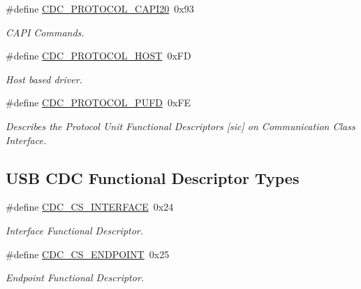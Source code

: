 \begin{DoxyCompactItemize}
\mbox{\label{group__cdc__protocol__group_ga4ae176ca7b4078cfc2506faff308d049}} 
\#define \hyperlink{group__cdc__protocol__group_ga4ae176ca7b4078cfc2506faff308d049}{C\+D\+C\+\_\+\+P\+R\+O\+T\+O\+C\+O\+L\+\_\+\+C\+A\+P\+I20}~0x93
\begin{DoxyCompactList}\small\item\em C\+A\+PI Commands. \end{DoxyCompactList}\item 
\mbox{\label{group__cdc__protocol__group_gae3fb87c639e467c9e9a1cab674a53463}} 
\#define \hyperlink{group__cdc__protocol__group_gae3fb87c639e467c9e9a1cab674a53463}{C\+D\+C\+\_\+\+P\+R\+O\+T\+O\+C\+O\+L\+\_\+\+H\+O\+ST}~0x\+FD
\begin{DoxyCompactList}\small\item\em Host based driver. \end{DoxyCompactList}\item 
\mbox{\label{group__cdc__protocol__group_gaa4704c0876c47f0fc9b4e1e2812a746c}} 
\#define \hyperlink{group__cdc__protocol__group_gaa4704c0876c47f0fc9b4e1e2812a746c}{C\+D\+C\+\_\+\+P\+R\+O\+T\+O\+C\+O\+L\+\_\+\+P\+U\+FD}~0x\+FE
\begin{DoxyCompactList}\small\item\em Describes the Protocol Unit Functional Descriptors \mbox{[}sic\mbox{]} on Communication Class Interface. \end{DoxyCompactList}\end{DoxyCompactItemize}
\subsection*{U\+SB C\+DC Functional Descriptor Types}
\begin{DoxyCompactItemize}
\item 
\mbox{\label{group__cdc__protocol__group_gafe0ca40b5aacc5c750f952af952583d2}} 
\#define \hyperlink{group__cdc__protocol__group_gafe0ca40b5aacc5c750f952af952583d2}{C\+D\+C\+\_\+\+C\+S\+\_\+\+I\+N\+T\+E\+R\+F\+A\+CE}~0x24
\begin{DoxyCompactList}\small\item\em Interface Functional Descriptor. \end{DoxyCompactList}\item 
\mbox{\label{group__cdc__protocol__group_gae07e10978a48ff63df33c3aeedf84c3a}} 
\#define \hyperlink{group__cdc__protocol__group_gae07e10978a48ff63df33c3aeedf84c3a}{C\+D\+C\+\_\+\+C\+S\+\_\+\+E\+N\+D\+P\+O\+I\+NT}~0x25
\begin{DoxyCompactList}\small\item\em Endpoint Functional Descriptor. \end{DoxyCompactList}\end{DoxyCompactItemize}
